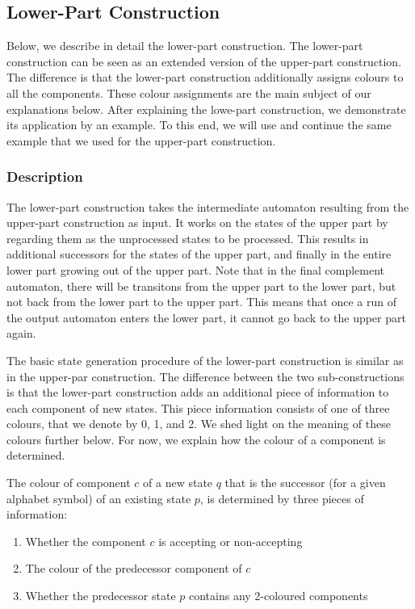 \subsection{Lower-Part Construction}
\label{3_lower_part}
Below, we describe in detail the lower-part construction. The lower-part construction can be seen as an extended version of the upper-part construction. The difference is that the lower-part construction additionally assigns colours to all the components. These colour assignments are the main subject of our explanations below. After explaining the lowe-part construction, we demonstrate its application by an example. To this end, we will use and continue the same example that we used for the upper-part construction.

\subsubsection{Description}
The lower-part construction takes the intermediate automaton resulting from the upper-part construction as input. It works on the states of the upper part by regarding them as the unprocessed states to be processed. This results in additional successors for the states of the upper part, and finally in the entire lower part growing out of the upper part. Note that in the final complement automaton, there will be transitons from the upper part to the lower part, but not back from the lower part to the upper part. This means that once a run of the output automaton enters the lower part, it cannot go back to the upper part again.

The basic state generation procedure of the lower-part construction is similar as in the upper-par construction. The difference between the two sub-constructions is that the lower-part construction adds an additional piece of information to each component of new states. This piece information consists of one of three colours, that we denote by 0, 1, and 2. We shed light on the meaning of these colours further below. For now, we explain how the colour of a component is determined.

The colour of component $c$ of a new state $q$ that is the successor (for a given alphabet symbol) of an existing state $p$, is determined by three pieces of information:

\begin{enumerate}
\item Whether the component $c$ is accepting or non-accepting
\item The colour of the predecessor component of $c$ 
\item Whether the predecessor state $p$ contains any 2-coloured components
\end{enumerate}

